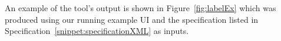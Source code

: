 An example of the tool's output is shown in Figure~\ref{fig:labelEx} which was produced using our running example UI and the specification listed in Specification~\ref{snippet:specificationXML} as inputs. 


